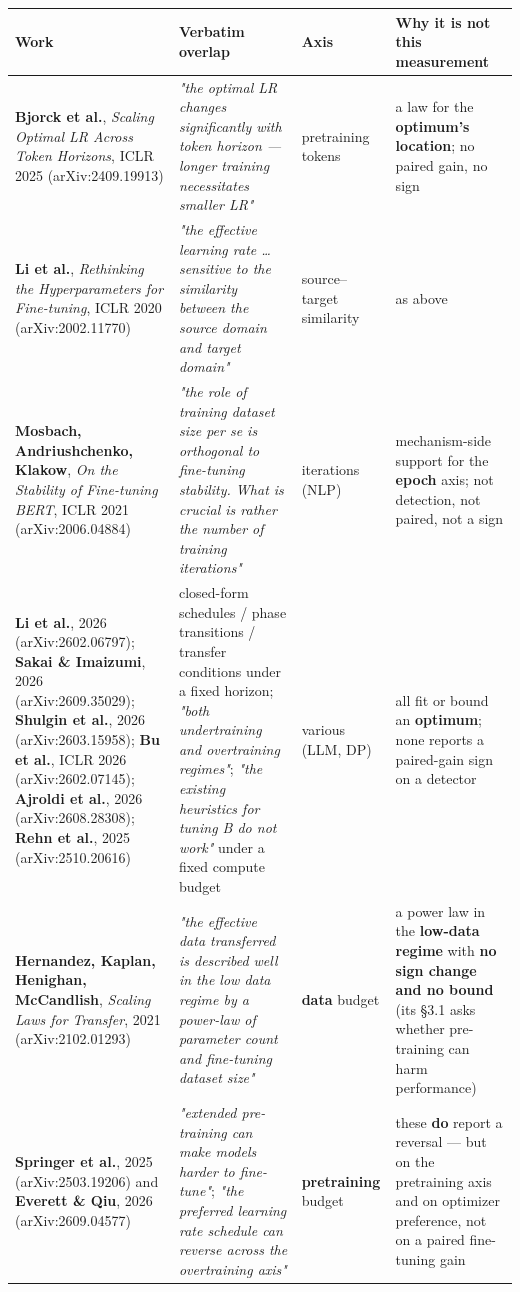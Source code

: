 \documentclass[pdflatex,sn-mathphys-ay]{sn-jnl}
\begin{document}
{\footnotesize
\setlength{\tabcolsep}{4pt}
\begin{longtable}{p{}p{}p{}p{}}
\toprule
Work & Verbatim overlap & Axis & Why it is not this measurement \\
\midrule
\endhead
\textbf{Bjorck et al.}, \emph{Scaling Optimal LR Across Token Horizons}, ICLR 2025 (arXiv:2409.19913) & \emph{"the optimal LR changes significantly with token horizon --- longer training necessitates smaller LR"} & pretraining tokens & a law for the \textbf{optimum's location}; no paired gain, no sign \\
\textbf{Li et al.}, \emph{Rethinking the Hyperparameters for Fine-tuning}, ICLR 2020 (arXiv:2002.11770) & \emph{"the effective learning rate \ldots{} sensitive to the similarity between the source domain and target domain"} & source--target similarity & as above \\
\textbf{Mosbach, Andriushchenko, Klakow}, \emph{On the Stability of Fine-tuning BERT}, ICLR 2021 (arXiv:2006.04884) & \emph{"the role of training dataset size per se is orthogonal to fine-tuning stability. What is crucial is rather the number of training iterations"} & iterations (NLP) & mechanism-side support for the \textbf{epoch} axis; not detection, not paired, not a sign \\
\textbf{Li et al.}, 2026 (arXiv:2602.06797); \textbf{Sakai \& Imaizumi}, 2026 (arXiv:2609.35029); \textbf{Shulgin et al.}, 2026 (arXiv:2603.15958); \textbf{Bu et al.}, ICLR 2026 (arXiv:2602.07145); \textbf{Ajroldi et al.}, 2026 (arXiv:2608.28308); \textbf{Rehn et al.}, 2025 (arXiv:2510.20616) & closed-form schedules / phase transitions / transfer conditions under a fixed horizon; \emph{"both undertraining and overtraining regimes"}; \emph{"the existing heuristics for tuning B do not work"} under a fixed compute budget & various (LLM, DP) & all fit or bound an \textbf{optimum}; none reports a paired-gain sign on a detector \\
\textbf{Hernandez, Kaplan, Henighan, McCandlish}, \emph{Scaling Laws for Transfer}, 2021 (arXiv:2102.01293) & \emph{"the effective data transferred is described well in the low data regime by a power-law of parameter count and fine-tuning dataset size"} & \textbf{data} budget & a power law in the \textbf{low-data regime} with \textbf{no sign change and no bound} (its \S{}3.1 asks whether pre-training can harm performance) \\
\textbf{Springer et al.}, 2025 (arXiv:2503.19206) and \textbf{Everett \& Qiu}, 2026 (arXiv:2609.04577) & \emph{"extended pre-training can make models harder to fine-tune"}; \emph{"the preferred learning rate schedule can reverse across the overtraining axis"} & \textbf{pretraining} budget & these \textbf{do} report a reversal --- but on the pretraining axis and on optimizer preference, not on a paired fine-tuning gain \\

\end{longtable}}
\end{document}
